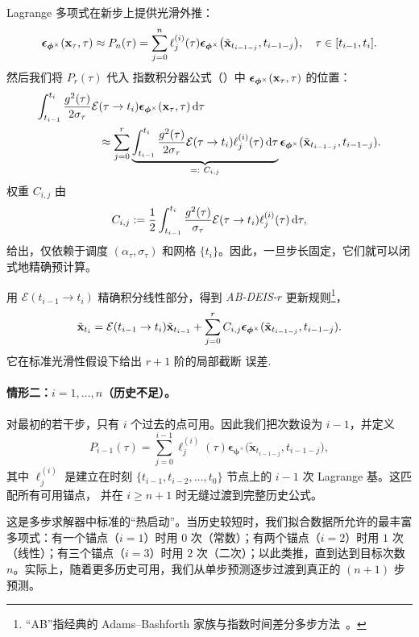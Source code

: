 Lagrange 多项式在新步上提供光滑外推：
\[
\bm{\epsilon}_{\bm{\phi}^\times}({\mathbf{x}}_\tau,\tau) \approx
P_n(\tau)=\sum_{j=0}^{n}\ell_j^{(i)}(\tau) 
\bm{\epsilon}_{\bm{\phi}^\times}\bigl(\tilde{{\mathbf{x}}}_{t_{i-1-j}}, t_{i-1-j}\bigr), 
\quad \tau \in [t_{i-1},t_i].
\]
然后我们将 $P_r(\tau)$ 代入
指数积分器公式（）中 ${\bm{\epsilon}}_{\bm{\phi}^\times}({\mathbf{x}}_\tau,\tau)$ 的位置：
\begin{align*}
    \int_{t_{i-1}}^{t_i}
\frac{g^2(\tau)}{2 \sigma_\tau} 
\mathcal{E}&(\tau\to t_i) 
{\bm{\epsilon}}_{\bm{\phi}^\times}({\mathbf{x}}_\tau,\tau)\mathop{}\!\mathrm{d}\tau
\\&\approx\sum_{j=0}^{r}
\underbrace{\int_{t_{i-1}}^{t_i}
\frac{g^2(\tau)}{2 \sigma_\tau} 
\mathcal{E}(\tau\to t_i) 
\ell_j^{(i)}(\tau)\mathop{}\!\mathrm{d}\tau}_{=:~C_{i,j}} 
{\bm{\epsilon}}_{\bm{\phi}^\times}(\tilde{{\mathbf{x}}}_{t_{i-1-j}},t_{i-1-j}).
\end{align*}
权重 $C_{i,j}$ 由
\begin{equation*}
C_{i,j} := \frac{1}{2} \int_{t_{i-1}}^{t_i} \frac{g^2(\tau)}{\sigma_\tau} \mathcal{E}(\tau \to t_i) \ell_j^{(i)}(\tau) \mathop{}\!\mathrm{d}\tau,
\end{equation*}
给出，仅依赖于调度 $(\alpha_\tau,\sigma_\tau)$ 和网格
$\{t_i\}$。因此，一旦步长固定，它们就可以闭式地精确预计算。

用 $\mathcal{E}(t_{i-1}\to t_i)$ 精确积分线性部分，得到 \emph{AB-DEIS-$r$} 更新规则\footnote{“AB”指经典的
Adams–Bashforth 家族与指数时间差分多步方法~\citep{hochbruck2010exponential}。}，
\[
\tilde{{\mathbf{x}}}_{t_i}
=
\mathcal{E}(t_{i-1}\to t_i) \tilde{{\mathbf{x}}}_{t_{i-1}}
+
\sum_{j=0}^{r} C_{i,j} 
{\bm{\epsilon}}_{\bm{\phi}^\times}(\tilde{{\mathbf{x}}}_{t_{i-1-j}},t_{i-1-j}).
\]
它在标准光滑性假设下给出 $r{+}1$ 阶的局部截断
误差.




\paragraph{情形二：$i=1,\dots,n$（历史不足）。}
对最初的若干步，只有 $i$ 个过去的点可用。因此我们把次数设为 $i{-}1$，并定义
\[
P_{i-1}(\tau)
=
\sum_{j=0}^{i-1}
\ell_j^{(i)}(\tau) 
\bm{\epsilon}_{\bm{\phi}^\times}\bigl(\tilde{\mathbf x}_{t_{i-1-j}},  t_{i-1-j}\bigr),
\]
其中 $\ell_j^{(i)}$ 是建立在时刻
$\{t_{i-1}, t_{i-2},\ldots,t_{0}\}$ 节点上的 $i{-}1$ 次 Lagrange 基。这匹配所有可用锚点，
并在 $i\ge n{+}1$ 时无缝过渡到完整历史公式。

这是多步求解器中标准的“热启动”。当历史较短时，我们拟合数据所允许的最丰富多项式：有一个锚点（$i{=}1$）时用 $0$ 次（常数）；有两个锚点（$i{=}2$）时用 $1$ 次（线性）；有三个锚点（$i{=}3$）时用 $2$ 次（二次）；以此类推，直到达到目标次数 $n$。实际上，随着更多历史可用，我们从单步预测逐步过渡到真正的 $(n{+}1)$ 步预测。


